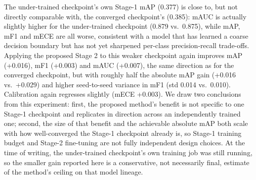\documentclass[conference]{IEEEtran}
\begin{document}
\begin{table}[htbp]
\caption{Stage-2 (proposed) applied to two independently trained Stage-1 checkpoints of different maturity. Stage-2 rows are mean $\pm$ sample standard deviation over the same 5 seeds used in Table~\ref{M-m:tab-entropy}, with the original implementation (Section~\ref{sec:corrections}).}
\begin{center}
\label{tab2}
\end{center}
\end{table}

The under-trained checkpoint's own Stage-1 mAP (0.377) is close to, but not directly comparable with, the converged checkpoint's (0.385): mAUC is actually slightly higher for the under-trained checkpoint (0.879 vs.\ 0.875), while mAP, mF1 and mECE are all worse, consistent with a model that has learned a coarse decision boundary but has not yet sharpened per-class precision-recall trade-offs. Applying the proposed Stage 2 to this weaker checkpoint again improves mAP (+0.016), mF1 (+0.003) and mAUC (+0.007), the same direction as for the converged checkpoint, but with roughly half the absolute mAP gain (+0.016 vs.\ +0.029) and higher seed-to-seed variance in mF1 (std 0.014 vs.\ 0.010). Calibration again regresses slightly (mECE +0.003). We draw two conclusions from this experiment: first, the proposed method's benefit is not specific to one Stage-1 checkpoint and replicates in direction across an independently trained one; second, the size of that benefit and the achievable absolute mAP both scale with how well-converged the Stage-1 checkpoint already is, so Stage-1 training budget and Stage-2 fine-tuning are not fully independent design choices. At the time of writing, the under-trained checkpoint's own training job was still running, so the smaller gain reported here is a conservative, not necessarily final, estimate of the method's ceiling on that model lineage.
\end{document}
